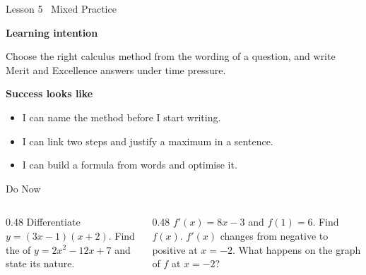 \documentclass[aspectratio=169,11pt,t,xcolor=table]{beamer}
\begin{document}
\begin{frame}{Lesson 5 \textperiodcentered\ Mixed Practice}\relax
\vskip6mm
{\sEmph\bfseries Learning intention\par}\vskip2mm
Choose the right calculus method from the wording of a question, and write Merit and Excellence answers under time pressure.
\vskip6mm
{\sEmph\bfseries Success looks like\par}\vskip2mm
\begin{itemize}
\item I can name the method before I start writing.
\item I can link two steps and justify a maximum in a sentence.
\item I can build a formula from words and optimise it.
\end{itemize}
\end{frame}

\begin{frame}{Do Now}\relax
\begin{columns}[T]
\begin{column}{0.48\textwidth}
 Differentiate $y=(3x-1)(x+2)$.
\vskip5mm
 Find the \tturn of $y=2x^{2}-12x+7$ and state its nature.
\end{column}
\begin{column}{0.48\textwidth}
 $f'(x)=8x-3$ and $f(1)=6$. Find $f(x)$.
\vskip5mm
 $f'(x)$ changes from negative to positive at $x=-2$. What happens on the graph of $f$ at $x=-2$?
\end{column}
\end{columns}
\end{frame}
\end{document}
